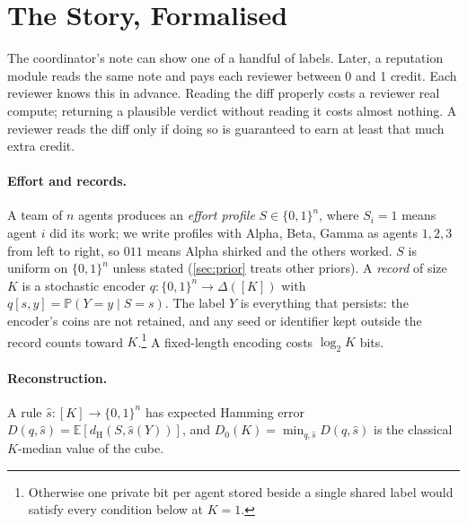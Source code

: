\documentclass[sigconf,anonymous,acmthm=false]{acmart}
\theoremstyle{acmplain}
\theoremstyle{acmdefinition}
\newcommand{\E}{\mathbb{E}}
\newcommand{\Pb}{\mathbb{P}}
\newcommand{\dH}{d_{\mathrm{H}}}
\newcommand{\shat}{\hat{s}}
\newcommand{\cube}{\{0,1\}}
\newcommand{\A}{\textsf{Alpha}}
\newcommand{\B}{\textsf{Beta}}
\newcommand{\G}{\textsf{Gamma}}
\begin{document}
\section{The Story, Formalised}\label{sec:model}

\begin{story}
The coordinator's note can show one of a handful of labels. Later, a reputation module
reads the same note and pays each reviewer between 0 and 1 credit. Each reviewer knows
this in advance. Reading the diff properly costs a reviewer real compute; returning a
plausible verdict without reading it costs almost nothing. A reviewer reads the diff only
if doing so is guaranteed to earn at least that much extra credit.
\end{story}

\paragraph{Effort and records.} A team of $n$ agents produces an \emph{effort profile}
$S\in\cube^n$, where $S_i=1$ means agent $i$ did its work; we write profiles with \A, \B,
\G{} as agents $1,2,3$ from left to right, so $011$ means \A{} shirked and the others
worked. $S$ is uniform on $\cube^n$ unless stated (\cref{sec:prior} treats other priors).
A \emph{record} of size $K$ is a stochastic encoder $q:\cube^n\to\Delta([K])$ with
$q[s,y]=\Pb(Y=y\mid S=s)$. The label $Y$ is everything that persists: the encoder's coins
are not retained, and any seed or identifier kept outside the record counts toward
$K$.\footnote{Otherwise one private bit per agent stored beside a single shared label would
satisfy every condition below at $K=1$.} A fixed-length encoding costs $\log_2 K$ bits.

\paragraph{Reconstruction.} A rule $\shat:[K]\to\cube^n$ has expected Hamming error
$D(q,\shat)=\E[\dH(S,\shat(Y))]$, and $D_0(K)=\min_{q,\shat}D(q,\shat)$ is the classical
$K$-median value of the cube.
\end{document}
